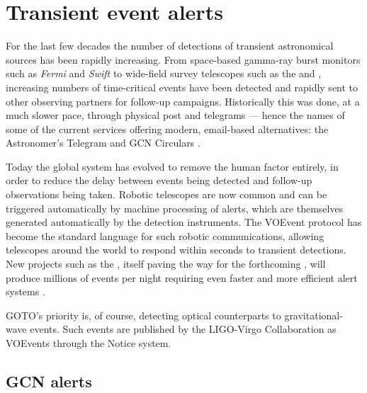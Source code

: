 \section{Transient event alerts}
\label{sec:transient_alerts}
\begin{colsection}


\begin{colsection}

For the last few decades the number of detections of transient astronomical sources has been rapidly increasing. From space-based gamma-ray burst monitors such as \textit{Fermi} and \textit{Swift} to wide-field survey telescopes such as the  and , increasing numbers of time-critical events have been detected and rapidly sent to other observing partners for follow-up campaigns. Historically this was done, at a much slower pace, through physical post and telegrams --- hence the names of some of the current services offering modern, email-based alternatives: the Astronomer's Telegram \citep{ATel} and GCN Circulars \citep{GCN}.

Today the global system has evolved to remove the human factor entirely, in order to reduce the delay between events being detected and follow-up observations being taken. Robotic telescopes are now common and can be triggered automatically by machine processing of alerts, which are themselves generated automatically by the detection instruments. The  VOEvent protocol \citep{voevent} has become the standard language for such robotic communications, allowing telescopes around the world to respond within seconds to transient detections. New projects such as the , itself paving the way for the forthcoming , will produce millions of events per night requiring even faster and more efficient alert systems \citep{ZTF_alerts}.

GOTO's priority is, of course, detecting optical counterparts to gravitational-wave events. Such events are published by the LIGO-Virgo Collaboration as VOEvents through the  Notice system.

\end{colsection}

\newpage
\subsection{GCN alerts}
\label{sec:gcn}
\begin{colsection}


\end{colsection}
\end{colsection}
